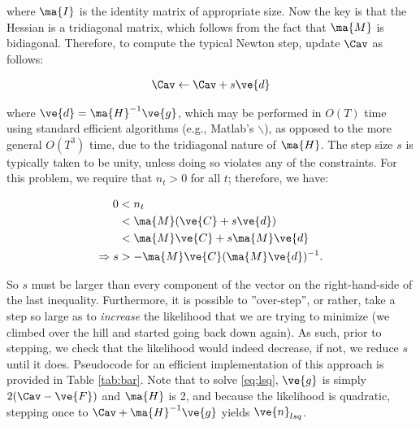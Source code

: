 \noindent where $\ma{I}$ is the identity matrix of appropriate size.  Now the key is that the Hessian is a tridiagonal matrix, which follows from the fact that $\ma{M}$ is bidiagonal.  Therefore, to compute the typical Newton step, update $\Cav$ as follows:

\begin{align}
\Cav \leftarrow \Cav + s \ve{d} 
\end{align}

\noindent where $\ve{d}=\ma{H}^{-1} \ve{g}$, which may be performed in $O(T)$ time using standard efficient algorithms (e.g., Matlab's $\backslash$), as opposed to the more general $O(T^3)$ time, due to the tridiagonal nature of $\ma{H}$.  The step size $s$ is typically taken to be unity, unless doing so violates any of the constraints.  For this problem, we require that $n_t>0$ for all $t$; therefore, we have:

\begin{align}
0&< n_t\\
&< \ma{M}(\ve{C} + s \ve{d})\\
&< \ma{M} \ve{C} + s \ma{M} \ve{d}\\
\Rightarrow s &> -\ma{M}\ve{C} (\ma{M} \ve{d})^{-1}.
\end{align}

\noindent So $s$ must be larger than every component of the vector on the right-hand-side of the last inequality.  Furthermore, it is possible to ''over-step'', or rather, take a step so large as to \emph{increase} the likelihood that we are trying to minimize (we climbed over the hill and started going back down again).  As such, prior to stepping, we check that the likelihood would indeed decrease, if not, we reduce $s$ until it does.  Pseudocode for an efficient implementation of this approach is provided in Table \ref{tab:bar}.  Note that to solve \eqref{eq:lsq}, $\ve{g}$ is simply $2(\Cav-\ve{F})$ and $\ma{H}$ is 2, and because the likelihood is quadratic, stepping once to $\Cav+\ma{H}^{-1}\ve{g}$ yields $\ve{n}_{lsq}$.


